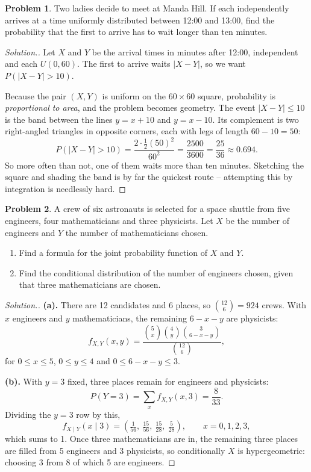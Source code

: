 \documentclass[12pt,a4paper]{report}
\theoremstyle{definition}
\theoremstyle{plain}
\theoremstyle{definition}
\newtheorem{problemx}{Problem}[section]
\newenvironment{problem}{\begin{problemx}}{\end{problemx}}
\newenvironment{solution}
  {\renewcommand{\qedsymbol}{}\begin{proof}[\textit{Solution}.]}
  {\end{proof}}
\begin{document}
\begin{problem}
Two ladies decide to meet at Manda Hill. If each independently arrives at a time uniformly
distributed between 12:00 and 13:00, find the probability that the first to arrive has to
wait longer than ten minutes.
\end{problem}

\begin{solution}
Let $X$ and $Y$ be the arrival times in minutes after 12:00, independent and each
$U(0,60)$. The first to arrive waits $|X-Y|$, so we want $P(|X-Y|>10)$.

Because the pair $(X,Y)$ is uniform on the $60\times 60$ square, probability is
\emph{proportional to area}, and the problem becomes geometry. The event $|X-Y|\leq 10$ is
the band between the lines $y = x+10$ and $y = x-10$. Its complement is two right-angled
triangles in opposite corners, each with legs of length $60-10 = 50$:
\[P(|X-Y|>10) = \frac{2\cdot\frac12(50)^{2}}{60^{2}} = \frac{2500}{3600}
 = \frac{25}{36} \approx 0.694.\]
So more often than not, one of them waits more than ten minutes. Sketching the square and
shading the band is by far the quickest route -- attempting this by integration is
needlessly hard.
\end{solution}

\begin{problem}
A crew of six astronauts is selected for a space shuttle from five engineers, four
mathematicians and three physicists. Let $X$ be the number of engineers and $Y$ the number
of mathematicians chosen.
\begin{enumerate}
\item[(a).] Find a formula for the joint probability function of $X$ and $Y$.
\item[(b).] Find the conditional distribution of the number of engineers chosen, given
that three mathematicians are chosen.
\end{enumerate}
\end{problem}

\begin{solution}
\textbf{(a).} There are 12 candidates and 6 places, so $\binom{12}{6} = 924$ crews. With
$x$ engineers and $y$ mathematicians, the remaining $6-x-y$ are physicists:
\[f_{X,Y}(x,y) = \frac{\binom{5}{x}\binom{4}{y}\binom{3}{6-x-y}}{\binom{12}{6}},\]
for $0\leq x\leq 5$, $0\leq y\leq 4$ and $0\leq 6-x-y\leq 3$.

\textbf{(b).} With $y=3$ fixed, three places remain for engineers and physicists:
\[P(Y=3) = \sum_{x}f_{X,Y}(x,3) = \frac{8}{33}.\]
Dividing the $y=3$ row by this,
\[f_{X\mid Y}(x\mid 3) = \left(\tfrac{1}{56},\ \tfrac{15}{56},\ \tfrac{15}{28},\
\tfrac{5}{28}\right), \qquad x = 0,1,2,3,\]
which sums to 1. Once three mathematicians are in, the remaining three places are filled
from 5 engineers and 3 physicists, so conditionally $X$ is hypergeometric: choosing 3 from
8 of which 5 are engineers.
\end{solution}
\end{document}
